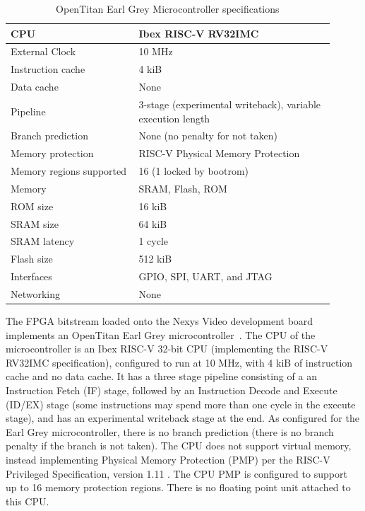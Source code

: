 \documentclass{article}
\begin{document}
\begin{table}[H]
\centering
    \begin{tabular}{|p{0.36\linewidth}||p{0.55\linewidth}|}
        \hline
        CPU & Ibex RISC-V RV32IMC \\
        \hline
        External Clock & 10 MHz \\
        \hline
        Instruction cache & 4 kiB \\
        \hline
        Data cache & None \\
        \hline
        Pipeline & 3-stage (experimental writeback), variable execution length \\
        \hline
        Branch prediction & None (no penalty for not taken) \\
        \hline
        Memory protection & RISC-V Physical Memory Protection\cite{riscv-priv} \\
        \hline
        Memory regions supported & 16 (1 locked by bootrom) \\
        \hline
        Memory & SRAM, Flash, ROM \\
        \hline
        ROM size & 16 kiB \\
        \hline
        SRAM size & 64 kiB \\
        \hline
        SRAM latency & 1 cycle~\cite{opentitan-latency} \\
        \hline
        Flash size & 512 kiB \\
        \hline
        Interfaces & GPIO, SPI, UART, and JTAG \\
        \hline
        Networking & None \\
        \hline
    \end{tabular}
\caption{OpenTitan Earl Grey Microcontroller specifications}
\label{table:1}
\end{table}

The FPGA bitstream loaded onto the Nexys Video development board implements an OpenTitan Earl Grey microcontroller~\cite{opentitangithub}. The CPU of the microcontroller is an Ibex RISC-V 32-bit CPU (implementing the RISC-V RV32IMC specification), configured to run at 10 MHz, with 4 kiB of instruction cache and no data cache. It has a three stage pipeline consisting of a an Instruction Fetch (IF) stage, followed by an Instruction Decode and Execute (ID/EX) stage (some instructions may spend more than one cycle in the execute stage), and has an experimental writeback stage at the end. As configured for the Earl Grey microcontroller, there is no branch prediction (there is no branch penalty if the branch is not taken). The CPU does not support virtual memory, instead implementing Physical Memory Protection (PMP) per the RISC-V Privileged Specification, version 1.11 \cite{riscv-priv}. The CPU PMP is configured to support up to 16 memory protection regions. There is no floating point unit attached to this CPU.
\end{document}
